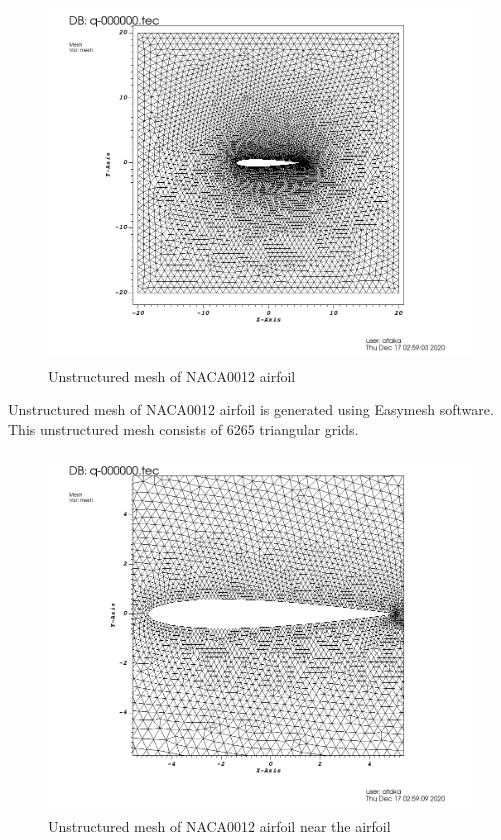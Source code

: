 \documentclass[letterpaper,12pt]{article}
\begin{document}
\begin{figure} [!h]
	\centering
	\includegraphics[height = 9.5cm]{graph/medium/medium_62650000.png}
	\caption{Unstructured mesh of NACA0012 airfoil}
    \label{fig:airfoilmesh}
\end{figure}

\vspace{1cm}

Unstructured mesh of NACA0012 airfoil is generated using Easymesh software. This 
unstructured mesh consists of 6265 triangular grids.

\newpage

\begin{figure} [!h]
	\centering
	\includegraphics[height = 9.5cm]{graph/medium/medium_62650001.png}
	\caption{Unstructured mesh of NACA0012 airfoil near the airfoil}
    \label{fig:airfoilmeshclose}
\end{figure}
\end{document}
